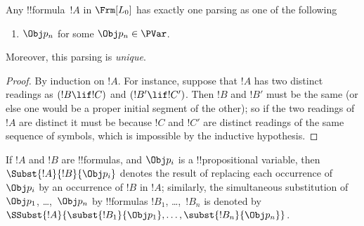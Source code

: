 \documentclass[../../../include/open-logic-section]{subfiles}
\begin{document}
\begin{prop}
Any !!{formula}~$!A$ in $ \Frm[L_0]$ has exactly one parsing as one of
the following
\begin{enumerate}


\item $\Obj p_n$ for some $\Obj p_n \in  \PVar$.
  




\end{enumerate}
Moreover, this parsing is \emph{unique}.
\end{prop}

\begin{proof}
By induction on $!A$. For instance, suppose that $!A$ has two distinct
readings as $(!B \lif !C)$ and $(!B' \lif !C')$. Then $!B$ and $!B'$
must be the same (or else one would be a proper initial segment of the
other); so if the two readings of $!A$ are distinct it must be because
$!C$ and $!C'$ are distinct readings of the same sequence of symbols,
which is impossible by the inductive hypothesis.
\end{proof}


\begin{defn}
If $!A$ and $!B$ are !!{formula}s, and $\Obj p_i$ is a !!{propositional
variable}, then $\Subst{!A}{!B}{\Obj p_i}$ denotes the result of
replacing each occurrence of $\Obj p_i$ by an occurrence of $!B$ in $!A$;
similarly, the simultaneous substitution of $\Obj p_1$, \dots,~$\Obj p_n$ by
!!{formula}s $!B_1$, \dots,~$!B_n$ is denoted by
$\SSubst{!A}{\subst{!B_1}{\Obj p_1},\dots,\subst{!B_n}{\Obj p_n}}$.
\end{defn}
\end{document}
